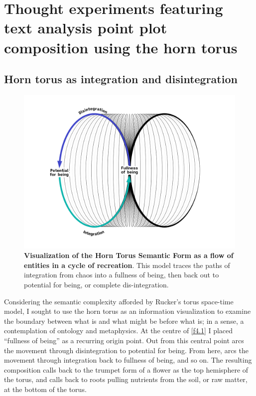 \section{Thought experiments featuring text analysis point plot composition using the horn torus}

\subsection{Horn torus as integration and disintegration}
\begin{figure}[h]
    \centering
    \includegraphics[width=0.5\linewidth]{figures/4.1.png}
    \caption[Visualization of the Horn Torus Semantic Form as a flow of entities]{\textbf{Visualization of the Horn Torus Semantic Form as a flow of entities in a cycle of recreation}. This model traces the paths of integration from chaos into a fullness of being, then back out to potential for being, or complete dis-integration.}
    \label{f4.1}
\end{figure}

Considering the semantic complexity afforded by Rucker’s torus space-time model, I sought to use the horn torus as an information visualization to examine the boundary between what is and what might be before what is; in a sense, a contemplation of ontology and metaphysics. At the centre of \autoref{f4.1} I placed ``fullness of being” as a recurring origin point. Out from this central point arcs the movement through disintegration to potential for being. From here, arcs the movement through integration back to fullness of being,  and so on. The resulting composition calls back to the trumpet form of a flower as the top hemisphere of the torus, and calls back to roots pulling nutrients from the soil, or raw matter, at the bottom of the torus. 

